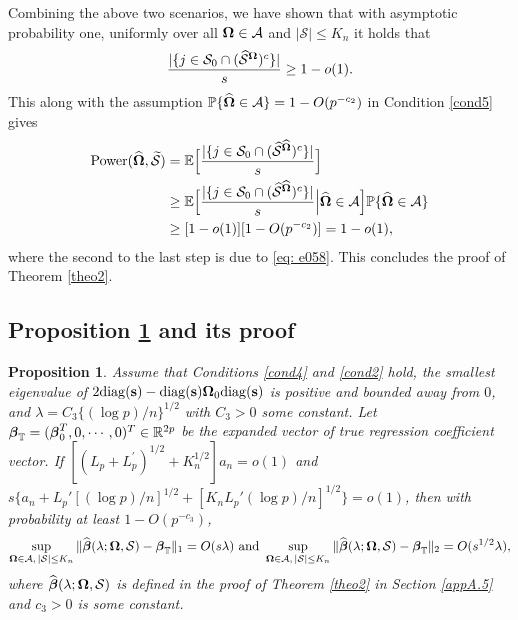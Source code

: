 \documentclass[11pt]{article}
\newtheorem{proposition}{Proposition}%
\newcommand{\bs}{\mbox{\bf s}}
\newcommand{\bbeta}{\mbox{\boldmath $\beta$}}
\newcommand{\bOmg}{\mbox{\boldmath $\Omega$}}
\newcommand{\wt}{\widetilde}
\newcommand{\mb}{\mathbb}
\newcommand{\wh}{\widehat}
\newcommand{\calA}{{\cal A}}
\newcommand{\sbOmg}{\mbox{\scriptsize\boldmath $\Omega$}}
\newcommand{\diag}{\mathrm{diag}}
\begin{document}
Combining the above two scenarios, we have shown that with asymptotic probability one, uniformly over all $\bOmg \in \calA$ and $|\mathcal S| \leq K_n$ it holds that
\begin{eqnarray}\label{eq: e058}
 \dfrac{ |\{j\in \mathcal{S}_0\cap (\widehat{\mathcal S}^{\sbOmg})^c\}|}{s}
\geq 1-o(1).
\end{eqnarray}
This along with the assumption $\mathbb{P}\{\wh{\bOmg} \in \calA\} =  1-O(p^{-c_2})$ in Condition \ref{cond5} gives
\begin{align*}
{\rm Power}(\wh{\bOmg}, \wt{\mathcal S}) &= \mb{E}\Big[\dfrac{ |\{j\in \mathcal{S}_0\cap (\widehat{\mathcal S}^{\wh{\sbOmg}})^c\}|}{s}\Big] \\
& \geq \mb{E}\Big[\dfrac{ |\{j\in \mathcal{S}_0\cap (\widehat{\mathcal S}^{\wh{\sbOmg}})^c\}|}{s}\Big| \wh{\bOmg}\in \calA\Big] \mathbb{P}\{\wh{\bOmg}\in \calA\} \\
& \geq [1-o(1)][1-O(p^{-c_2})] = 1 -o(1),
\end{align*}
where the second to the last step is due to \eqref{eq: e058}. This concludes the proof of Theorem \ref{theo2}.


\subsection{Proposition \ref{pro1} and its proof} \label{appA.6}

\begin{proposition}\label{pro1}
Assume that Conditions \ref{cond4} and \ref{cond2} hold, the smallest  eigenvalue of $2\diag(\bs) - \diag(\bs)\bOmg_0\diag(\bs)$ is positive and bounded away from $0$, and $\lambda =  C_3\{(\log p)/n\}^{1/2}$ with $C_3>0$ some constant. Let $\bbeta_{\mathbb{T}}=(\bbeta_0^T, 0,\cdots,0)^T \in \mathbb{R}^{2p}$ be the expanded vector of true regression coefficient vector. If $[(L_p + L_p^{\prime})^{1/2}+K_n^{1/2}] a_n = o(1)$ and $s \{a_n + L_{p}' [(\log p)/n]^{1/2} + [K_nL_p'(\log p)/n]^{1/2} \} = o(1)$, then with probability at least $1-O(p^{-c_3})$,
\[
		\sup_{\sbOmg \in \calA,\, |\mathcal{S}|\leq K_n}\|\widehat{\bbeta}(
		\lambda; \bOmg, \mathcal{S})-\bbeta_{\mathbb{T}}\|_1=O(s\lambda) \text{ and }
		\sup_{\sbOmg \in \calA,\, |\mathcal{S}|\leq K_n}\|\widehat{\bbeta}(\lambda; \bOmg, \mathcal{S})-\bbeta_{\mathbb{T}}\|_2=O(s^{1/2}\lambda),
\]
where $\widehat{\bbeta}(\lambda; \bOmg, \mathcal{S})$ is defined in the proof of Theorem \ref{theo2} in Section \ref{appA.5} and $c_3 > 0$ is some constant.
\end{proposition}
\end{document}
